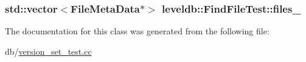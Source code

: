 \subsubsection[{files\+\_\+}]{\setlength{\rightskip}{0pt plus 5cm}std\+::vector$<${\bf File\+Meta\+Data}$\ast$$>$ leveldb\+::\+Find\+File\+Test\+::files\+\_\+}\label{classleveldb_1_1_find_file_test_a53b61e6b01283c235fae219013b0e2c7}


The documentation for this class was generated from the following file\+:\begin{DoxyCompactItemize}
\item 
db/\hyperlink{version__set__test_8cc}{version\+\_\+set\+\_\+test.\+cc}\end{DoxyCompactItemize}
